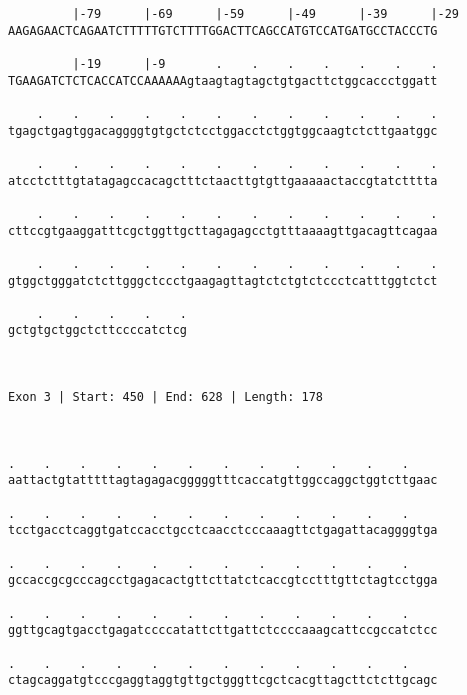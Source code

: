 \documentclass{article}
\begin{document}
\begin{Verbatim}
         |-79      |-69      |-59      |-49      |-39      |-29
AAGAGAACTCAGAATCTTTTTGTCTTTTGGACTTCAGCCATGTCCATGATGCCTACCCTG
                                                            
         |-19      |-9       .    .    .    .    .    .    .
TGAAGATCTCTCACCATCCAAAAAAgtaagtagtagctgtgacttctggcaccctggatt
                                                            
    .    .    .    .    .    .    .    .    .    .    .    .
tgagctgagtggacaggggtgtgctctcctggacctctggtggcaagtctcttgaatggc
                                                            
    .    .    .    .    .    .    .    .    .    .    .    .
atcctctttgtatagagccacagctttctaacttgtgttgaaaaactaccgtatctttta
                                                            
    .    .    .    .    .    .    .    .    .    .    .    .
cttccgtgaaggatttcgctggttgcttagagagcctgtttaaaagttgacagttcagaa
                                                            
    .    .    .    .    .    .    .    .    .    .    .    .
gtggctgggatctcttgggctccctgaagagttagtctctgtctccctcatttggtctct
                                                            
    .    .    .    .    .
gctgtgctggctcttccccatctcg
                         
                         
 
Exon 3 | Start: 450 | End: 628 | Length: 178



.    .    .    .    .    .    .    .    .    .    .    .    
aattactgtatttttagtagagacgggggtttcaccatgttggccaggctggtcttgaac
                                                            
.    .    .    .    .    .    .    .    .    .    .    .    
tcctgacctcaggtgatccacctgcctcaacctcccaaagttctgagattacaggggtga
                                                            
.    .    .    .    .    .    .    .    .    .    .    .    
gccaccgcgcccagcctgagacactgttcttatctcaccgtcctttgttctagtcctgga
                                                            
.    .    .    .    .    .    .    .    .    .    .    .    
ggttgcagtgacctgagatccccatattcttgattctccccaaagcattccgccatctcc
                                                            
.    .    .    .    .    .    .    .    .    .    .    .    
ctagcaggatgtcccgaggtaggtgttgctgggttcgctcacgttagcttctcttgcagc
                                                            

\end{Verbatim}
\end{document}
